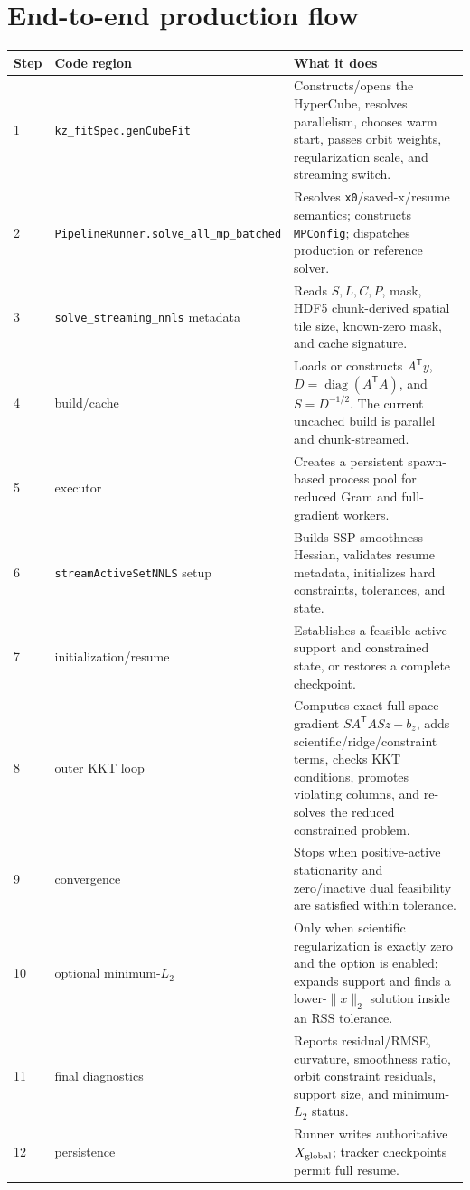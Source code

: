 \documentclass[10pt,a4paper]{article}
\newcommand{\code}[1]{\texttt{#1}}
\begin{document}
\section{End-to-end production flow}
\begin{longtable}{p{}p{}p{}}
\toprule
\textbf{Step} & \textbf{Code region} & \textbf{What it does}\\
\midrule\endhead
1 & \code{kz\_fitSpec.genCubeFit} & Constructs/opens the HyperCube, resolves parallelism, chooses warm start, passes orbit weights, regularization scale, and streaming switch.\\
2 & \code{PipelineRunner.solve\_all\_mp\_batched} & Resolves \code{x0}/saved-x/resume semantics; constructs \code{MPConfig}; dispatches production or reference solver.\\
3 & \code{solve\_streaming\_nnls} metadata & Reads $S,L,C,P$, mask, HDF5 chunk-derived spatial tile size, known-zero mask, and cache signature.\\
4 & build/cache & Loads or constructs $A^{\mathsf T}y$, $D=\operatorname{diag}(A^{\mathsf T}A)$, and $S=D^{-1/2}$. The current uncached build is parallel and chunk-streamed.\\
5 & executor & Creates a persistent spawn-based process pool for reduced Gram and full-gradient workers.\\
6 & \code{streamActiveSetNNLS} setup & Builds SSP smoothness Hessian, validates resume metadata, initializes hard constraints, tolerances, and state.\\
7 & initialization/resume & Establishes a feasible active support and constrained state, or restores a complete checkpoint.\\
8 & outer KKT loop & Computes exact full-space gradient $SA^{\mathsf T}ASz-b_z$, adds scientific/ridge/constraint terms, checks KKT conditions, promotes violating columns, and re-solves the reduced constrained problem.\\
9 & convergence & Stops when positive-active stationarity and zero/inactive dual feasibility are satisfied within tolerance.\\
10 & optional minimum-$L_2$ & Only when scientific regularization is exactly zero and the option is enabled; expands support and finds a lower-$\lVert x\rVert_2$ solution inside an RSS tolerance.\\
11 & final diagnostics & Reports residual/RMSE, curvature, smoothness ratio, orbit constraint residuals, support size, and minimum-$L_2$ status.\\
12 & persistence & Runner writes authoritative $X_{\rm global}$; tracker checkpoints permit full resume.\\
\bottomrule
\end{longtable}
\end{document}
